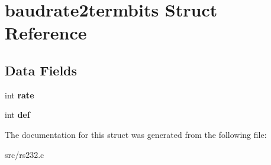 \section{baudrate2termbits Struct Reference}
\label{structbaudrate2termbits}
\subsection*{Data Fields}
\begin{DoxyCompactItemize}
\item 
int {\bfseries rate}\label{structbaudrate2termbits_aca5e0bd4d1bb8ca39005d057c98f4ed1}

\item 
int {\bfseries def}\label{structbaudrate2termbits_a65bafeff4b6ee135e73ec863bd13d2ae}

\end{DoxyCompactItemize}


The documentation for this struct was generated from the following file\+:\begin{DoxyCompactItemize}
\item 
src/rs232.\+c\end{DoxyCompactItemize}
